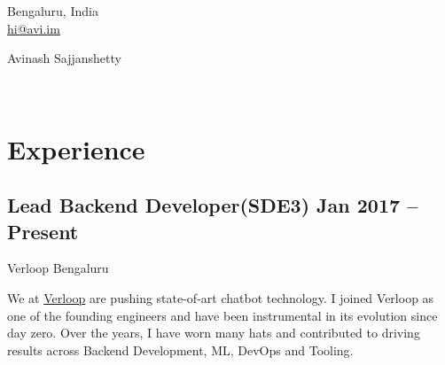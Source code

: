 \documentclass[a4,10pt]{article}
\newcommand{\subtext}[1]{
#1\par\vspace{-0.2cm}}
\begin{document}
\begin{center}
    \begin{minipage}[b]{0.24\textwidth}
            \large Bengaluru, India \\
            \large \href{mailto:hi@avi.im}{\color{black}hi@avi.im} 
    \end{minipage}%
    \begin{minipage}[b]{0.5\textwidth}
            \centering
            {\HUGE Avinash Sajjanshetty} \\ %
            \vspace{0.1cm}
    \end{minipage}%
    \begin{minipage}[b]{0.24\textwidth}
            \flushright \large  %
            \faGithub{} \\
            \faGlobe{}
    \end{minipage}   

\end{center}

\section{Experience}
\subsection*{Lead Backend Developer(SDE3) \hfill Jan 2017 -- Present} 
\subtext{Verloop \hfill Bengaluru}
\begin{flushleft}
We at {\href{https://verloop.io}{Verloop}} are pushing state-of-art chatbot technology. I joined Verloop as one of the founding engineers and have been instrumental in its evolution since day zero. Over the years,  I have worn many hats and contributed to driving results across Backend Development, ML, DevOps and Tooling.
\end{flushleft}
\end{document}
